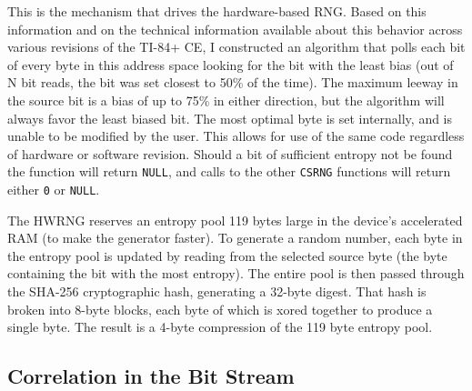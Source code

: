 \documentclass[titlepage]{article}
\begin{document}
			This is the mechanism that drives the hardware-based RNG. Based on this information and on the technical information available about this behavior across various revisions of the TI-84+ CE, I constructed an algorithm that polls each bit of every byte in this address space looking for the bit with the least bias (out of N bit reads, the bit was set closest to 50\% of the time). The maximum leeway in the source bit is a bias of up to 75\% in either direction, but the algorithm will always favor the least biased bit. The most optimal byte is set internally, and is unable to be modified by the user. This allows for use of the same code regardless of hardware or software revision. Should a bit of sufficient entropy not be found the function will return \texttt{NULL}, and calls to the other \texttt{CSRNG} functions will return either \texttt{0} or \texttt{NULL}.
	
			The HWRNG reserves an entropy pool 119 bytes large in the device's accelerated RAM (to make the generator faster). To generate a random number, each byte in the entropy pool is updated by reading from the selected source byte (the byte containing the bit with the most entropy). The entire pool is then passed through the SHA-256 cryptographic hash, generating a 32-byte digest. That hash is broken into 8-byte blocks, each byte of which is xored together to produce a single byte. The result is a 4-byte compression of the 119 byte entropy pool.
			
		\subsection{Correlation in the Bit Stream}
		
\end{document}

